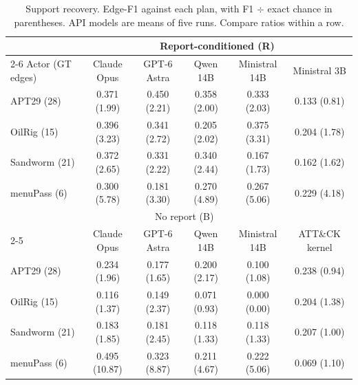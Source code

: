 \documentclass[letterpaper]{article} %
\begin{document}
\begin{table}[t]
\centering
\small
\setlength{\tabcolsep}{5pt}
\begin{tabular}{@{}lccccc@{}}
\toprule
 & \multicolumn{5}{c}{Report-conditioned (R)} \\
\cmidrule(l){2-6}
Actor (GT edges) & Claude Opus & GPT-6 Astra & Qwen 14B & Ministral 14B & Ministral 3B \\
\midrule
APT29 (28) & 0.371 (1.99) & 0.450 (2.21) & 0.358 (2.00) & 0.333 (2.03) & 0.133 (0.81) \\
OilRig (15) & 0.396 (3.23) & 0.341 (2.72) & 0.205 (2.02) & 0.375 (3.31) & 0.204 (1.78) \\
Sandworm (21) & 0.372 (2.65) & 0.331 (2.22) & 0.340 (2.44) & 0.167 (1.73) & 0.162 (1.62) \\
menuPass (6) & 0.300 (5.78) & 0.181 (3.30) & 0.270 (4.89) & 0.267 (5.06) & 0.229 (4.18) \\
\midrule
 & \multicolumn{4}{c}{No report (B)} & \\
\cmidrule(lr){2-5}
 & Claude Opus & GPT-6 Astra & Qwen 14B & Ministral 14B & ATT\&CK kernel \\
\midrule
APT29 (28) & 0.234 (1.96) & 0.177 (1.65) & 0.200 (2.17) & 0.100 (1.08) & 0.238 (0.94) \\
OilRig (15) & 0.116 (1.37) & 0.149 (2.37) & 0.071 (0.93) & 0.000 (0.00) & 0.204 (1.38) \\
Sandworm (21) & 0.183 (1.85) & 0.181 (2.45) & 0.118 (1.33) & 0.118 (1.33) & 0.207 (1.00) \\
menuPass (6) & 0.495 (10.87) & 0.323 (8.87) & 0.211 (4.67) & 0.222 (5.06) & 0.069 (1.10) \\
\bottomrule
\end{tabular}
\caption{Support recovery. Edge-F1 against each plan, with F1 $\div$ exact chance in parentheses. API models are means of five runs. Compare ratios within a row.}
\label{tab:recovery}
\end{table}
\end{document}
